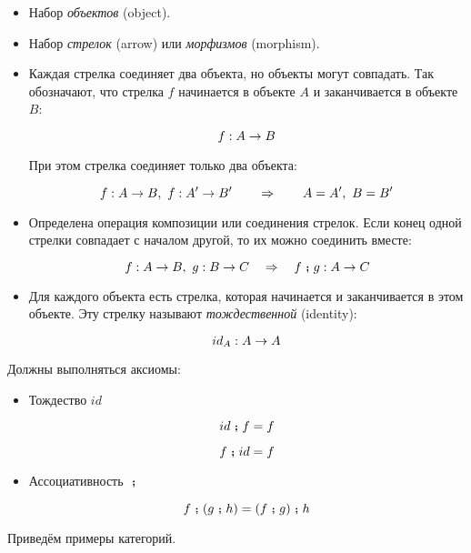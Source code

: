 \begin{itemize}
\item
  Набор \emph{объектов} (object).
\item
  Набор \emph{стрелок} (arrow) или \emph{морфизмов} (morphism).
\item
  Каждая стрелка соединяет два объекта, но объекты могут совпадать. Так
  обозначают, что стрелка $f$ начинается в объекте $A$ и заканчивается в
  объекте $B$:

  \[f : A \rightarrow B\]

  При этом стрелка соединяет только два объекта:

  \[f : A \rightarrow B,\ f : A' \rightarrow B' \qquad \Rightarrow \qquad A=A',\ B=B'\]
\item
  Определена операция композиции или соединения стрелок. Если конец
  одной стрелки совпадает с началом другой, то их можно соединить
  вместе:

  \[f:A \rightarrow B,\ g : B\rightarrow C \quad \Rightarrow \quad f \footnotesize\textbf{~;~}\normalsize g : A \rightarrow C\]
\item
  Для каждого объекта есть стрелка, которая начинается и заканчивается в
  этом объекте. Эту стрелку называют \emph{тождественной} (identity):

  \[id_A : A \rightarrow A\]
\end{itemize}

Должны выполняться аксиомы:

\begin{itemize}
\item
  Тождество $id$

  \[id \footnotesize\textbf{~;~}\normalsize f = f\]

  \[f \footnotesize\textbf{~;~}\normalsize id = f\]
\item
  Ассоциативность $\footnotesize\textbf{~;~}\normalsize$

  \[f \footnotesize\textbf{~;~}\normalsize (g \footnotesize\textbf{~;~}\normalsize h) = (f \footnotesize\textbf{~;~}\normalsize g) \footnotesize\textbf{~;~}\normalsize h\]
\end{itemize}

Приведём примеры категорий.

